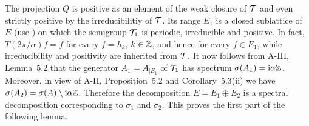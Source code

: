 The projection $Q$ is positive as an element of the weak closure of $\mathcal{T}$ and even strictly positive by the irreducibilitiy of $\mathcal{T}$.
Its range $E_{1}$ is a closed sublattice of $E$ (use \citet[Proposition III.11.5]{schaefer:1974}) on which the semigroup $\mathcal{T}_{1}$ is periodic, irreducible and positive.
In fact, $T(2\pi/\alpha)f = f$ for every $f = h_{k}$, $k \in \mathbb{Z}$, and hence for every $f \in E_{1}$, while irreducibility and positivity are inherited from $\mathcal{T}$.
It now follows from A-III, Lemma~5.2 that the generator $A_{1} = A_{|E_{1}}$ of $\mathcal{T}_{1}$ has spectrum $\sigma(A_{1}) = \mathrm{i}\alpha\mathbb{Z}$.
Moreover, in view of A-II, Proposition~5.2 and Corollary~5.3(ii) 
we have $\sigma(A_{2}) = \sigma(A) \setminus \mathrm{i}\alpha\mathbb{Z}$.
Therefore the decomposition $E = E_{1} \oplus E_{2}$ is a spectral decomposition corresponding to $\sigma_{1}$ and $\sigma_{2}$.
This proves the first part of the following lemma.

